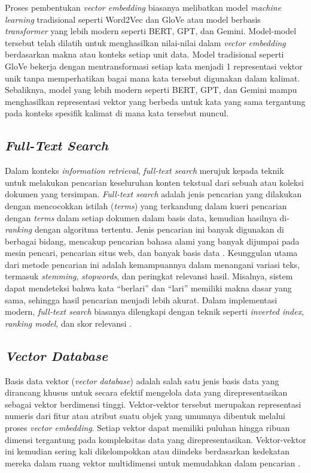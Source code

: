 Proses pembentukan \textit{vector embedding} biasanya melibatkan model \textit{machine learning} tradisional seperti Word2Vec dan GloVe atau model berbasis \textit{transformer} yang lebih modern seperti BERT, GPT, dan Gemini.
Model-model tersebut telah dilatih untuk menghasilkan nilai-nilai dalam \textit{vector embedding} berdasarkan makna atau konteks setiap unit data.
Model tradisional seperti GloVe bekerja dengan mentransformasi setiap kata menjadi 1 representasi vektor unik tanpa memperhatikan bagai mana kata tersebut digunakan dalam kalimat.
Sebaliknya, model yang lebih modern seperti BERT, GPT, dan Gemini mampu menghasilkan representasi vektor yang berbeda untuk kata yang sama tergantung pada konteks spesifik kalimat di mana kata tersebut muncul.

\subsection{\textit{Full-Text Search}}
Dalam konteks \textit{information retrieval}, \textit{full-text search} merujuk kepada teknik untuk melakukan pencarian keseluruhan konten tekstual dari sebuah atau koleksi dokumen yang tersimpan.
\textit{Full-text search} adalah jenis pencarian yang dilakukan dengan mencocokkan istilah (\textit{terms}) yang terkandung dalam kueri pencarian dengan \textit{terms} dalam setiap dokumen dalam basis data, kemudian hasilnya di-\textit{ranking} dengan algoritma tertentu.
Jenis pencarian ini banyak digunakan di berbagai bidang, mencakup pencarian bahasa alami yang banyak dijumpai pada mesin pencari, pencarian situs web, dan banyak basis data \cite{beall2008weaknesses}.
Keunggulan utama dari metode pencarian ini adalah kemampuannya dalam menangani variasi teks, termasuk \textit{stemming}, \textit{stopwords}, dan peringkat relevansi hasil.
Misalnya, sistem dapat mendeteksi bahwa kata “berlari” dan “lari” memiliki makna dasar yang sama, sehingga hasil pencarian menjadi lebih akurat.
Dalam implementasi modern, \textit{full-text search} biasanya dilengkapi dengan teknik seperti \textit{inverted index}, \textit{ranking model}, dan skor relevansi \cite{mongodb2025fulltext}.

\subsection{\textit{Vector Database}}
Basis data vektor (\textit{vector database}) adalah salah satu jenis basis data yang dirancang khusus untuk secara efektif mengelola data yang direpresentasikan sebagai vektor berdimensi tinggi.
Vektor-vektor tersebut merupakan representasi numeris dari fitur atau atribut suatu objek yang umumnya dibentuk melalui proses \textit{vector embedding}.
Setiap vektor dapat memiliki puluhan hingga ribuan dimensi tergantung pada kompleksitas data yang direpresentasikan.
Vektor-vektor ini kemudian sering kali dikelompokkan atau diindeks berdasarkan kedekatan mereka dalam ruang vektor multidimensi untuk memudahkan dalam pencarian \cite{Han2023VectorDB_ANN_SimilaritySearch}.

